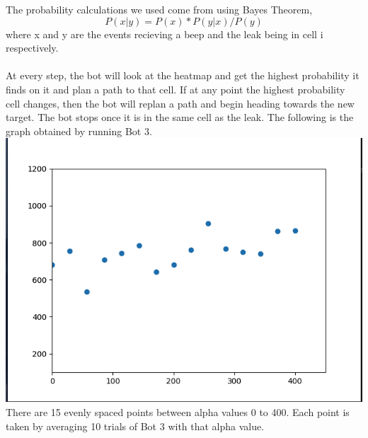 \documentclass[12pt]{article}
\begin{document}
The probability calculations we used come from using Bayes Theorem, 
\[
P(x | y) = P(x)* P(y | x) / P(y)
\] 
where x and y are the events recieving a beep and the leak being in cell i respectively. 
\\
\\
At every step, the bot will look at the heatmap and get the highest probability it finds on it and plan a path to that 
cell. If at any point the highest probability cell changes, then the bot will replan a path and begin
heading towards the new target. The bot stops once it is in the same cell as the leak. 
The following is the graph obtained by running Bot 3. \\
\includegraphics*[scale=0.5]{Bot3} \\
There are 15 evenly spaced points between alpha values 0 to 400. Each point 
is taken by averaging 10 trials of Bot 3 with that alpha value. 
\end{document}
